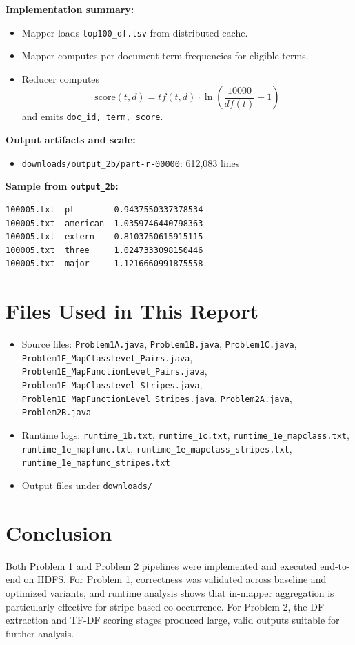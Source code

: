 \documentclass[11pt]{article}
\begin{document}
\textbf{Implementation summary:}
\begin{itemize}[leftmargin=*]
  \item Mapper loads \texttt{top100\_df.tsv} from distributed cache.
  \item Mapper computes per-document term frequencies for eligible terms.
  \item Reducer computes
  \[
  \text{score}(t,d) = tf(t,d) \cdot \ln\left(\frac{10000}{df(t)} + 1\right)
  \]
  and emits \texttt{doc\_id, term, score}.
\end{itemize}

\textbf{Output artifacts and scale:}
\begin{itemize}[leftmargin=*]
  \item \texttt{downloads/output\_2b/part-r-00000}: 612,083 lines
\end{itemize}

\textbf{Sample from \texttt{output\_2b}:}
\begin{lstlisting}
100005.txt  pt        0.9437550337378534
100005.txt  american  1.0359746440798363
100005.txt  extern    0.8103750615915115
100005.txt  three     1.0247333098150446
100005.txt  major     1.1216660991875558
\end{lstlisting}

\section{Files Used in This Report}
\begin{itemize}[leftmargin=*]
  \item Source files: \texttt{Problem1A.java}, \texttt{Problem1B.java}, \texttt{Problem1C.java},
  \texttt{Problem1E\_MapClassLevel\_Pairs.java}, \texttt{Problem1E\_MapFunctionLevel\_Pairs.java},
  \texttt{Problem1E\_MapClassLevel\_Stripes.java}, \texttt{Problem1E\_MapFunctionLevel\_Stripes.java},
  \texttt{Problem2A.java}, \texttt{Problem2B.java}
  \item Runtime logs: \texttt{runtime\_1b.txt}, \texttt{runtime\_1c.txt},
  \texttt{runtime\_1e\_mapclass.txt}, \texttt{runtime\_1e\_mapfunc.txt},
  \texttt{runtime\_1e\_mapclass\_stripes.txt}, \texttt{runtime\_1e\_mapfunc\_stripes.txt}
  \item Output files under \texttt{downloads/}
\end{itemize}

\section{Conclusion}
Both Problem 1 and Problem 2 pipelines were implemented and executed end-to-end on HDFS.
For Problem 1, correctness was validated across baseline and optimized variants, and runtime analysis shows
that in-mapper aggregation is particularly effective for stripe-based co-occurrence.
For Problem 2, the DF extraction and TF-DF scoring stages produced large, valid outputs suitable for further analysis.
\end{document}
